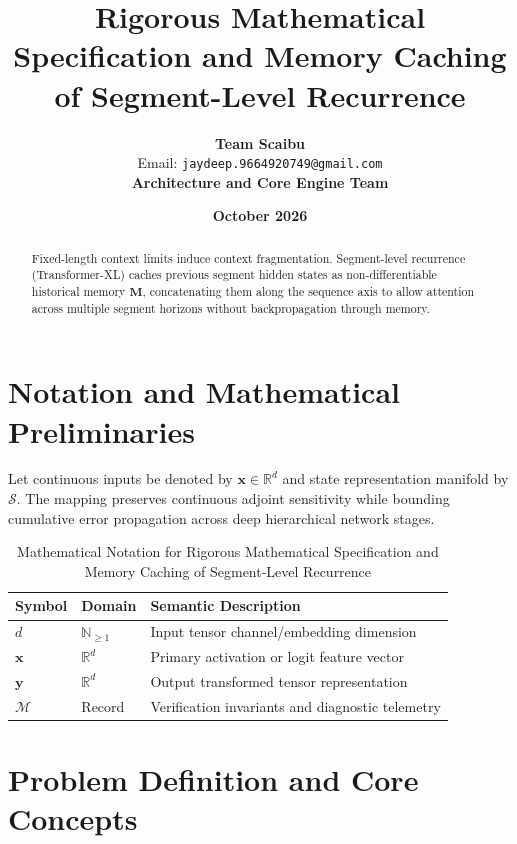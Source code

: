 \documentclass[11pt,a4paper]{article}
\title{\textbf{Rigorous Mathematical Specification and Memory Caching of Segment-Level Recurrence}}
\author{\textbf{Team Scaibu} \\ \small Email: \texttt{jaydeep.9664920749@gmail.com} \\ \small \textbf{Architecture and Core Engine Team}}
\date{\textbf{October 2026}}
\theoremstyle{definition}
\begin{document}
\maketitle

\begin{abstract}
Fixed-length context limits induce context fragmentation. Segment-level recurrence (Transformer-XL) caches previous segment hidden states as non-differentiable historical memory $\mathbf{M}$, concatenating them along the sequence axis to allow attention across multiple segment horizons without backpropagation through memory.
\end{abstract}

\section{Notation and Mathematical Preliminaries}

Let continuous inputs be denoted by $\mathbf{x} \in \mathbb{R}^d$ and state representation manifold by $\mathcal{S}$. The mapping preserves continuous adjoint sensitivity while bounding cumulative error propagation across deep hierarchical network stages.

\begin{table}[h]
\centering
\caption{Mathematical Notation for Rigorous Mathematical Specification and Memory Caching of Segment-Level Recurrence}
\begin{tabular}{lll}
\toprule
\textbf{Symbol} & \textbf{Domain} & \textbf{Semantic Description} \\
\midrule
$d$ & $\mathbb{N}_{\ge 1}$ & Input tensor channel/embedding dimension \\
$\mathbf{x}$ & $\mathbb{R}^d$ & Primary activation or logit feature vector \\
$\mathbf{y}$ & $\mathbb{R}^d$ & Output transformed tensor representation \\
$\mathcal{M}$ & Record & Verification invariants and diagnostic telemetry \\
\bottomrule
\end{tabular}
\end{table}

\section{Problem Definition and Core Concepts}
\end{document}
